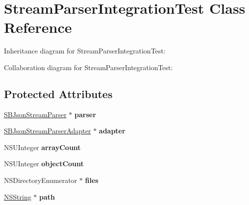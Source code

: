 \hypertarget{interface_stream_parser_integration_test}{
\section{\-Stream\-Parser\-Integration\-Test \-Class \-Reference}
\label{interface_stream_parser_integration_test}
}


\-Inheritance diagram for \-Stream\-Parser\-Integration\-Test\-:


\-Collaboration diagram for \-Stream\-Parser\-Integration\-Test\-:
\subsection*{\-Protected \-Attributes}
\begin{DoxyCompactItemize}
\item 
\hypertarget{interface_stream_parser_integration_test_a94df8b80d855527b9cecd92c05c55c3f}{
\hyperlink{interface_s_b_json_stream_parser}{\-S\-B\-Json\-Stream\-Parser} $\ast$ {\bfseries parser}}
\label{interface_stream_parser_integration_test_a94df8b80d855527b9cecd92c05c55c3f}

\item 
\hypertarget{interface_stream_parser_integration_test_a71b694ae2595185b4106f9f6530f5d87}{
\hyperlink{interface_s_b_json_stream_parser_adapter}{\-S\-B\-Json\-Stream\-Parser\-Adapter} $\ast$ {\bfseries adapter}}
\label{interface_stream_parser_integration_test_a71b694ae2595185b4106f9f6530f5d87}

\item 
\hypertarget{interface_stream_parser_integration_test_aedf27da28520a68b8202b0e893802ced}{
\-N\-S\-U\-Integer {\bfseries array\-Count}}
\label{interface_stream_parser_integration_test_aedf27da28520a68b8202b0e893802ced}

\item 
\hypertarget{interface_stream_parser_integration_test_ad115ddfe483737958228f79631976d14}{
\-N\-S\-U\-Integer {\bfseries object\-Count}}
\label{interface_stream_parser_integration_test_ad115ddfe483737958228f79631976d14}

\item 
\hypertarget{interface_stream_parser_integration_test_aaa821dcd0d267c1f7d1ee8473c71a92a}{
\-N\-S\-Directory\-Enumerator $\ast$ {\bfseries files}}
\label{interface_stream_parser_integration_test_aaa821dcd0d267c1f7d1ee8473c71a92a}

\item 
\hypertarget{interface_stream_parser_integration_test_aa29d05a17ca261f20416240ba7e60658}{
\hyperlink{class_n_s_string}{\-N\-S\-String} $\ast$ {\bfseries path}}
\label{interface_stream_parser_integration_test_aa29d05a17ca261f20416240ba7e60658}

\end{DoxyCompactItemize}


